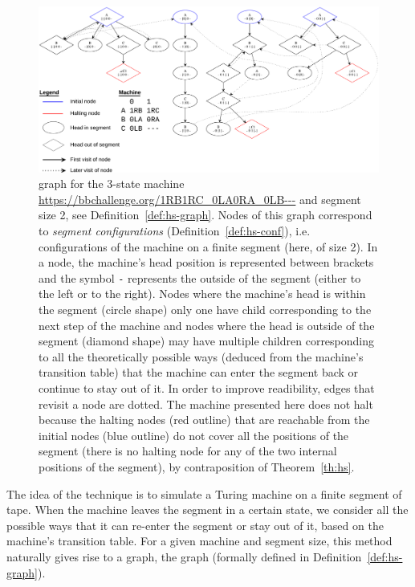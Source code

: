 \begin{figure}[h!]
  \centering
  \includegraphics[width=1\textwidth]{halting-segment.pdf}
  \caption{\HS graph for the 3-state machine \url{https://bbchallenge.org/1RB1RC_0LA0RA_0LB---} and segment size 2, see Definition~\ref{def:hs-graph}. Nodes of this graph correspond to \textit{segment configurations} (Definition~\ref{def:hs-conf}), i.e. configurations of the machine on a finite segment (here, of size 2). In a node, the machine's head position is represented between brackets and the symbol \texttt{-} represents the outside of the segment (either to the left or to the right). Nodes where the machine's head is within the segment (circle shape) only one have child corresponding to the next step of the machine and nodes where the head is outside of the segment (diamond shape) may have multiple children corresponding to all the theoretically possible ways (deduced from the machine's transition table) that the machine can enter the segment back or continue to stay out of it. In order to improve readibility, edges that revisit a node are dotted. The machine presented here does not halt because the halting nodes (red outline) that are reachable from the initial nodes (blue outline) do not cover all the positions of the segment (there is no halting node for any of the two internal positions of the segment), by contraposition of Theorem~\ref{th:hs}. }\label{fig:hs}
\end{figure}

The idea of the \HS technique is to simulate a Turing machine on a finite segment of tape. When the machine leaves the segment in a certain state, we consider all the possible ways that it can re-enter the segment or stay out of it, based on the machine's transition table. For a given machine and segment size, this method naturally gives rise to a graph, the \HS graph (formally defined in Definition~\ref{def:hs-graph}).

